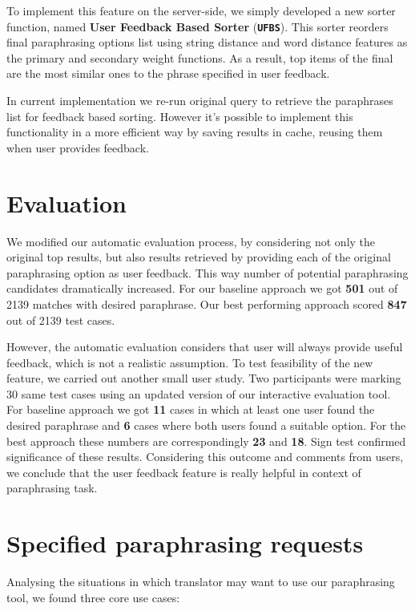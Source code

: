 To implement this feature on the server-side, we simply developed a new sorter function, named \textbf{User Feedback Based Sorter} (\texttt{\textbf{UFBS}}). This sorter reorders final paraphrasing options list using string distance and word distance features as the primary and secondary weight functions. As a result, top items of the final are the most similar ones to the phrase specified in user feedback. 

In current implementation we re-run original query to retrieve the paraphrases list for feedback based sorting. However it's possible to implement this functionality in a more efficient way by saving results in cache, reusing them when user provides feedback. 

\section{Evaluation}

We modified our automatic evaluation process, by considering not only the original top results, but also results retrieved by providing each of the original paraphrasing option as user feedback. This way number of potential paraphrasing candidates dramatically increased. For our baseline approach we got \textbf{501} out of 2139 matches with desired paraphrase. Our best performing approach scored \textbf{847} out of 2139 test cases. 

However, the automatic evaluation considers that user will always provide useful feedback, which is not a realistic assumption. To test feasibility of the new feature, we carried out another small user study. Two participants were marking 30 same test cases using an updated version of our interactive evaluation tool. For baseline approach we got \textbf{11} cases in which at least one user found the desired paraphrase and \textbf{6} cases where both users found a suitable option. For the best approach these numbers are correspondingly \textbf{23} and \textbf{18}. Sign test confirmed significance of these results. Considering this outcome and comments from users, we conclude that the user feedback feature is really helpful in context of paraphrasing task.

\section{Specified paraphrasing requests}

Analysing the situations in which translator may want to use our paraphrasing tool, we found three core use cases:

